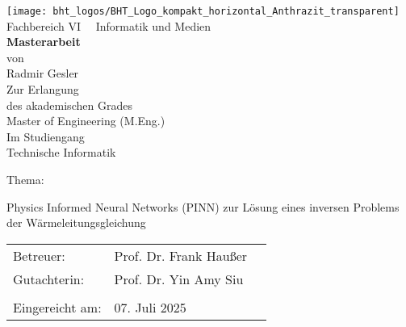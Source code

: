 \begin{centering}
	
	\texttt{[image: bht\_logos/BHT\_Logo\_kompakt\_horizontal\_Anthrazit\_transparent]}\\
	\vspace*{60pt}
	Fachbereich VI \ \ Informatik und Medien\\
	\vspace*{30pt}
	\textbf{Masterarbeit}\\
	\vspace*{40pt}
	von\\
	\vspace*{20pt}
	Radmir Gesler\\
	\vspace*{30pt}
	Zur Erlangung \\
	des akademischen Grades\\
	Master of Engineering (M.Eng.)\\
	\vspace*{40pt}
	Im Studiengang\\
	Technische Informatik
	
\end{centering}
\vspace*{40pt}
Thema: 
\begin{center}
	Physics Informed Neural Networks (PINN) zur Lösung eines inversen Problems der Wärmeleitungsgleichung
\end{center}

\vspace*{40pt}
\begin{tabular}{l l  p{4pt}}
	Betreuer: & Prof. Dr. Frank Haußer  \\
	Gutachterin: & Prof. Dr. Yin Amy Siu \\
	\\
	Eingereicht am: & 07. Juli 2025 \\
\end{tabular}